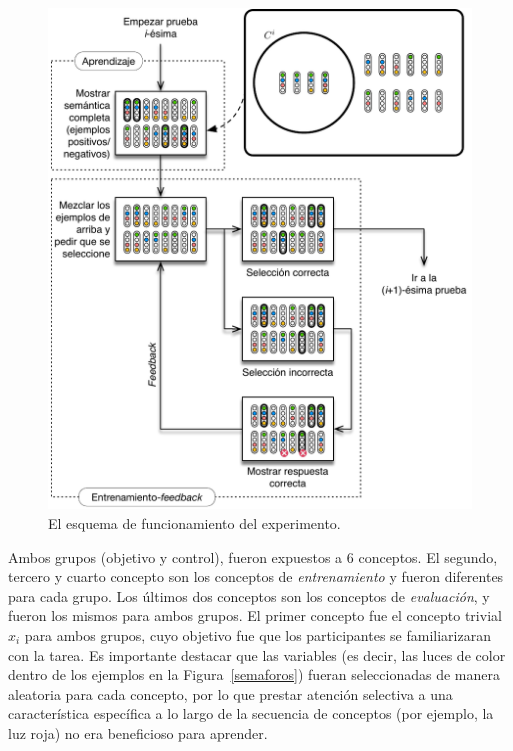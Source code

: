 \begin{figure}
\begin{center}
  \includegraphics[scale=1]{../figuras/pre/experimento_PRE.pdf}
\end{center}\caption{El esquema de funcionamiento del experimento.}\label{fig:experimentoPRE}
\end{figure}



Ambos grupos (objetivo y control), fueron expuestos a 6 conceptos. El segundo, tercero y cuarto concepto son los conceptos de {\em entrenamiento} y fueron diferentes para cada grupo. Los últimos dos conceptos son los conceptos de {\em evaluación}, y fueron los mismos para ambos grupos. El primer concepto fue el concepto trivial $x_i$ para ambos grupos, cuyo objetivo fue que los participantes se familiarizaran con la tarea. Es importante destacar que las variables (es decir, las luces de color dentro de los ejemplos en la Figura~\ref{semaforos}) fueran seleccionadas de manera aleatoria para cada concepto, por lo que prestar atención selectiva a una característica específica a lo largo de la secuencia de conceptos (por ejemplo, la luz roja) no era beneficioso para aprender.

